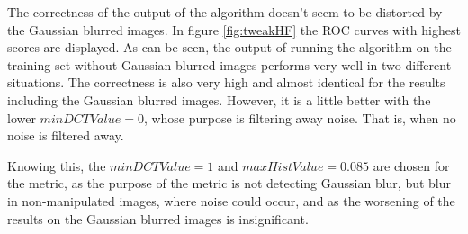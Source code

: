 The correctness of the output of the algorithm doesn't seem to be distorted by the Gaussian blurred images. In figure \ref{fig:tweakHF} the ROC curves with highest scores are displayed. As can be seen, the output of running the algorithm on the training set without Gaussian blurred images performs very well in two different situations. The correctness is also very high and almost identical for the results including the Gaussian blurred images. However, it is a little better with the lower $minDCTValue=0$, whose purpose is filtering away noise. That is, when no noise is filtered away.

Knowing this, the $minDCTValue=1$ and $maxHistValue=0.085$ are chosen for the metric, as the purpose of the metric is not detecting Gaussian blur, but blur in non-manipulated images, where noise could occur, and as the worsening of the results on the Gaussian blurred images is insignificant.



